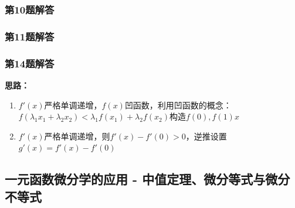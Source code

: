 \documentclass[./book.tex]{subfiles}
\begin{document}
    \subsubsection*{第10题解答}
    \begin{analysisbox}
    \end{analysisbox}

    \subsubsection*{第11题解答}
    \begin{analysisbox}
    \end{analysisbox}

    \subsubsection*{第14题解答}
    \begin{analysisbox}
        \textbf{思路：}
        \begin{enumerate}
            \item $f'(x)$严格单调递增，$f(x)$凹函数，利用凹函数的概念：$f(\lambda_1 x_1 + \lambda_2 x_2) < \lambda_1 f(x_1) + \lambda_2 f(x_2)$构造$f(0), f(1)x$
            \item $f'(x)$严格单调递增，则$f'(x) - f'(0) > 0$，逆推设置$g'(x) = f'(x) - f'(0)$
        \end{enumerate}
    \end{analysisbox}

    \subsection{一元函数微分学的应用 - 中值定理、微分等式与微分不等式}
\end{document}
